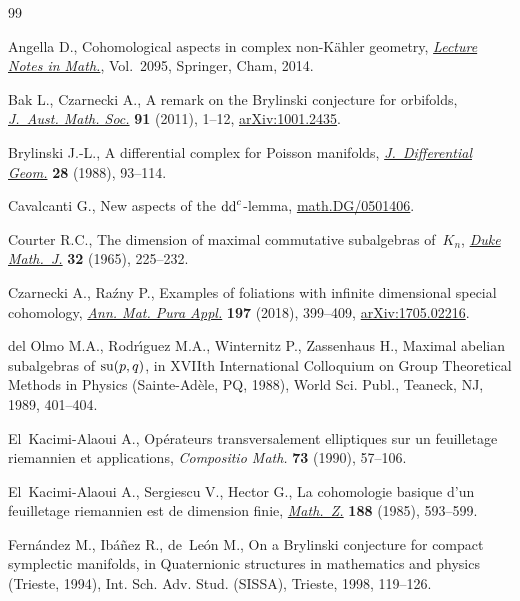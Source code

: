 \documentclass[10pt,a4paper]{amsart}
\numberwithin{equation}{section}
\begin{document}
\begin{thebibliography}{99}
\footnotesize\itemsep=0pt

Angella D., Cohomological aspects in complex non-{K}\"ahler geometry,
 \href{https://doi.org/10.1007/978-3-319-02441-7}{\textit{Lecture Notes in Math.}}, Vol.~2095, Springer, Cham, 2014.

Bak L., Czarnecki A., A remark on the {B}rylinski conjecture for orbifolds,
 \href{https://doi.org/10.1017/S1446788711001455}{\textit{J.~Aust. Math. Soc.}} \textbf{91} (2011), 1--12, \href{https://arxiv.org/abs/1001.2435}{arXiv:1001.2435}.

Brylinski J.-L., A differential complex for {P}oisson manifolds,
 \href{https://doi.org/10.4310/jdg/1214442161}{\textit{J.~Differential Geom.}} \textbf{28} (1988), 93--114.

Cavalcanti G., New aspects of the ${\rm dd}^c$-lemma, \href{https://arxiv.org/abs/math.DG/0501406}{math.DG/0501406}.

Courter R.C., The dimension of maximal commutative subalgebras of~{$K_{n}$},
 \href{https://doi.org/10.1215/S0012-7094-65-03219-9}{\textit{Duke Math.~J.}} \textbf{32} (1965), 225--232.

Czarnecki A., Ra\'zny P., Examples of foliations with infinite dimensional
 special cohomology, \href{https://doi.org/10.1007/s10231-017-0684-x}{\textit{Ann. Mat. Pura Appl.}} \textbf{197} (2018),
 399--409, \href{https://arxiv.org/abs/1705.02216}{arXiv:1705.02216}.

del Olmo M.A., Rodr\'{\i}guez M.A., Winternitz P., Zassenhaus H., Maximal
 abelian subalgebras of {${\rm su}(p,q)$}, in X{VII}th {I}nternational
 {C}olloquium on {G}roup {T}heoretical {M}ethods in {P}hysics
 ({S}ainte-{A}d\`ele, {PQ}, 1988), World Sci. Publ., Teaneck, NJ, 1989,
 401--404.

El~Kacimi-Alaoui A., Op\'erateurs transversalement elliptiques sur un
 feuilletage riemannien et applications, \textit{Compositio Math.} \textbf{73}
 (1990), 57--106.

El~Kacimi-Alaoui A., Sergiescu V., Hector G., La cohomologie basique d'un
 feuilletage riemannien est de dimension finie, \href{https://doi.org/10.1007/BF01161658}{\textit{Math.~Z.}} \textbf{188}
 (1985), 593--599.

Fern\'andez M., Ib\'a\~nez R., de~Le\'on M., On a {B}rylinski conjecture for
 compact symplectic manifolds, in Quaternionic structures in mathematics and
 physics ({T}rieste, 1994), Int. Sch. Adv. Stud. (SISSA), Trieste, 1998,
 119--126.


\end{thebibliography}
\end{document}
